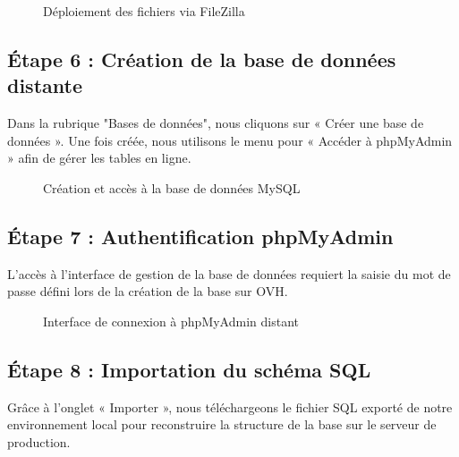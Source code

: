 \begin{figure}[H]
    \centering
    \caption{Déploiement des fichiers via FileZilla}
\end{figure}

\subsection{Étape 6 : Création de la base de données distante}
Dans la rubrique "Bases de données", nous cliquons sur « Créer une base de données ». Une fois créée, nous utilisons le menu pour « Accéder à phpMyAdmin » afin de gérer les tables en ligne.

\begin{figure}[H]
    \centering
    \caption{Création et accès à la base de données MySQL}
\end{figure}

\subsection{Étape 7 : Authentification phpMyAdmin}
L'accès à l'interface de gestion de la base de données requiert la saisie du mot de passe défini lors de la création de la base sur OVH.

\begin{figure}[H]
    \centering
    \caption{Interface de connexion à phpMyAdmin distant}
\end{figure}

\subsection{Étape 8 : Importation du schéma SQL}
Grâce à l'onglet « Importer », nous téléchargeons le fichier SQL exporté de notre environnement local pour reconstruire la structure de la base sur le serveur de production.


